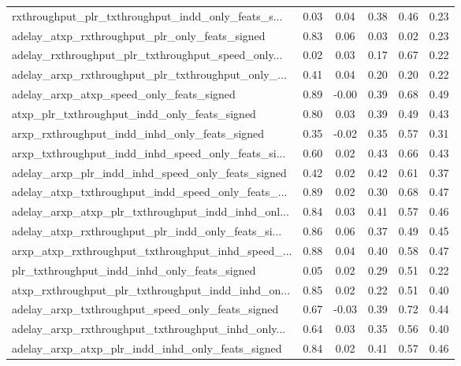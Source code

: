 \begin{tabular}{|l|*{4}{c}|r|}
rxthroughput\_plr\_txthroughput\_indd\_only\_feats\_s... & 0.03 &  0.04 &    0.38 &       0.46 &  0.23 \\
adelay\_atxp\_rxthroughput\_plr\_only\_feats\_signed     & 0.83 &  0.06 &    0.03 &       0.02 &  0.23 \\
adelay\_rxthroughput\_plr\_txthroughput\_speed\_only... & 0.02 &  0.03 &    0.17 &       0.67 &  0.22 \\
adelay\_arxp\_rxthroughput\_plr\_txthroughput\_only\_... & 0.41 &  0.04 &    0.20 &       0.20 &  0.22 \\
adelay\_arxp\_atxp\_speed\_only\_feats\_signed           & 0.89 & -0.00 &    0.39 &       0.68 &  0.49 \\
atxp\_plr\_txthroughput\_indd\_only\_feats\_signed       & 0.80 &  0.03 &    0.39 &       0.49 &  0.43 \\
arxp\_rxthroughput\_indd\_inhd\_only\_feats\_signed      & 0.35 & -0.02 &    0.35 &       0.57 &  0.31 \\
arxp\_txthroughput\_indd\_inhd\_speed\_only\_feats\_si... & 0.60 &  0.02 &    0.43 &       0.66 &  0.43 \\
adelay\_arxp\_plr\_indd\_inhd\_speed\_only\_feats\_signed  & 0.42 &  0.02 &    0.42 &       0.61 &  0.37 \\
adelay\_atxp\_txthroughput\_indd\_speed\_only\_feats\_... & 0.89 &  0.02 &    0.30 &       0.68 &  0.47 \\
adelay\_arxp\_atxp\_plr\_txthroughput\_indd\_inhd\_onl... & 0.84 &  0.03 &    0.41 &       0.57 &  0.46 \\
adelay\_atxp\_rxthroughput\_plr\_indd\_only\_feats\_si... & 0.86 &  0.06 &    0.37 &       0.49 &  0.45 \\
arxp\_atxp\_rxthroughput\_txthroughput\_inhd\_speed\_... & 0.88 &  0.04 &    0.40 &       0.58 &  0.47 \\
plr\_txthroughput\_indd\_inhd\_only\_feats\_signed       & 0.05 &  0.02 &    0.29 &       0.51 &  0.22 \\
atxp\_rxthroughput\_plr\_txthroughput\_indd\_inhd\_on... & 0.85 &  0.02 &    0.22 &       0.51 &  0.40 \\
adelay\_arxp\_txthroughput\_speed\_only\_feats\_signed   & 0.67 & -0.03 &    0.39 &       0.72 &  0.44 \\
adelay\_arxp\_rxthroughput\_txthroughput\_inhd\_only... & 0.64 &  0.03 &    0.35 &       0.56 &  0.40 \\
adelay\_arxp\_atxp\_plr\_indd\_inhd\_only\_feats\_signed   & 0.84 &  0.02 &    0.41 &       0.57 &  0.46 \\

\end{tabular}
